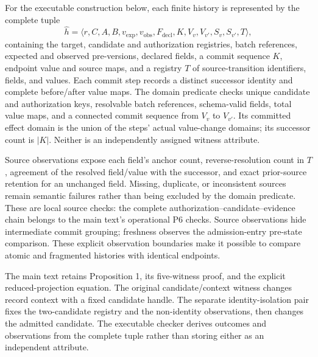 For the executable construction below, each finite history is represented by the complete tuple
\begin{equation}
\widehat h=\langle r,C,A,B,v_{\mathrm{exp}},v_{\mathrm{obs}},
F_{\mathrm{decl}},K,V_v,V_{v'},S_v,S_{v'},T\rangle,
\label{eq:witness-history}
\end{equation}
containing the target, candidate and authorization registries, batch references, expected and observed pre-versions, declared fields, a commit sequence $K$, endpoint value and source maps, and a registry $T$ of source-transition identifiers, fields, and values. Each commit step records a distinct successor identity and complete before/after value maps. The domain predicate checks unique candidate and authorization keys, resolvable batch references, schema-valid fields, total value maps, and a connected commit sequence from $V_v$ to $V_{v'}$. Its committed effect domain is the union of the steps' actual value-change domains; its successor count is $|K|$. Neither is an independently assigned witness attribute.

Source observations expose each field's anchor count, reverse-resolution count in $T$, agreement of the resolved field/value with the successor, and exact prior-source retention for an unchanged field. Missing, duplicate, or inconsistent sources remain semantic failures rather than being excluded by the domain predicate. These are local source checks: the complete authorization--candidate--evidence chain belongs to the main text's operational P6 checks. Source observations hide intermediate commit grouping; freshness observes the admission-entry pre-state comparison. These explicit observation boundaries make it possible to compare atomic and fragmented histories with identical endpoints.

The main text retains Proposition 1, its five-witness proof, and the explicit reduced-projection equation. The original candidate/context witness changes record context with a fixed candidate handle. The separate identity-isolation pair fixes the two-candidate registry and the non-identity observations, then changes the admitted candidate. The executable checker derives outcomes and observations from the complete tuple rather than storing either as an independent attribute.

